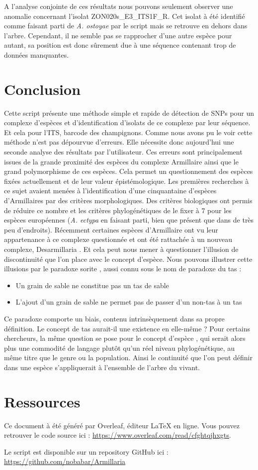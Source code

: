 A l'analyse conjointe de ces résultats nous pouvons seulement observer une anomalie concernant l'isolat ZON020s\_E3\_ITS1F\_R. Cet isolat à été identifié comme faisant parti de \textit{A. ostoyae} par le script mais se retrouve en dehors dans l'arbre. Cependant, il ne semble pas se rapprocher d'une autre espèce pour autant, sa position est donc sûrement due à une séquence contenant trop de données manquantes.

\section{Conclusion}
\label{sec:Conclusion}

Cette script présente une méthode simple et rapide de détection de SNPs pour un complexe d'espèces et d'identification d'isolats de ce complexe par leur séquence. Et cela pour l'ITS, barcode des champignons. Comme nous avons pu le voir cette méthode n'est pas dépourvue d'erreurs. Elle nécessite donc aujourd'hui une seconde analyse des résultats par l'utilisateur. Ces erreurs sont principalement issues de la grande proximité des espèces du complexe Armillaire ainsi que le grand polymorphisme de ces espèces. Cela permet un questionnement des espèces fixées actuellement et de leur valeur épistémologique. Les premières recherches à ce sujet avaient menées à l'identification d'une cinquantaine d'espèces d'Armillaires par des critères morphologiques. Des critères biologiques ont permis de réduire ce nombre et les critères phylogénétiques de le fixer à 7 pour les espèces européennes (\textit{A. ectypa} en faisant parti, bien que présent que dans de très peu d'endroits). Récemment certaines espèces d'Armillaire ont vu leur appartenance à ce complexe questionnée et ont été rattachée à un nouveau complexe, Desarmillaria \cite{Park2018}. Et cela peut nous mener à questionner l'illusion de discontinuité que l'on place avec le concept d'espèce. Nous pouvons illustrer cette illusions par le paradoxe sorite \cite{Beth1954}, aussi connu sous le nom de paradoxe du tas :
\begin{itemize}
    \item Un grain de sable ne constitue pas un tas de sable
    \item L'ajout d'un grain de sable ne permet pas de passer d'un non-tas  à un tas
\end{itemize}
Ce paradoxe comporte un biais, contenu intrinsèquement dans sa propre définition. Le concept de tas aurait-il une existence en elle-même ? Pour certains chercheurs, la même question se pose pour le concept d'espèce \cite{Lherminier2005, Hart2011}, qui serait alors plus une commodité de langage plutôt qu'un réel niveau phylogénétique, au même titre que le genre ou la population. Ainsi le continuité que l'on peut définir dans une espèce s'appliquerait à l'ensemble de l'arbre du vivant.

\section{Ressources}

Ce document à été généré par Overleaf, éditeur LaTeX en ligne. Vous pouvez retrouver le code source ici : \url{https://www.overleaf.com/read/cfghtqjhxgts}.

Le script est disponible sur un repository GitHub ici : \url{https://github.com/nobabar/Armillaria}

